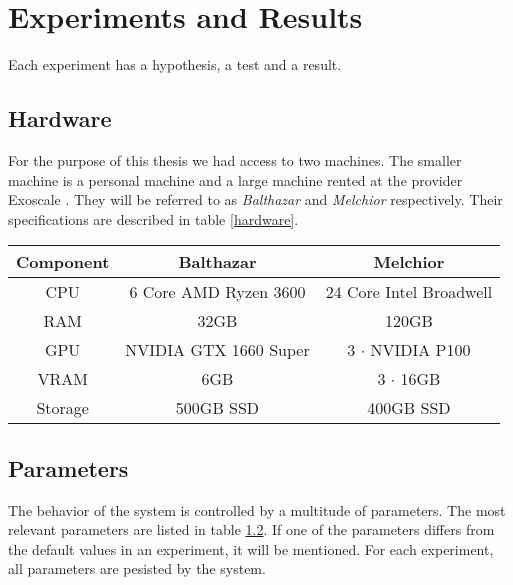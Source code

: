 \chapter{Experiments and Results}
\label{experiments-and-results}

Each experiment has a hypothesis, a test and a result.

\section{Hardware}
For the purpose of this thesis we had access to two machines. The smaller machine is a personal machine and a large machine rented at the provider Exoscale \cite{noauthor_exoscale_nodate}. They will be referred to as \textit{Balthazar} and \textit{Melchior} respectively. Their specifications are described in table \ref{hardware}.

\begin{table*}
    \begin{center}
        \begin{tabular}{ c|c|c }
            Component & Balthazar             & Melchior                \\
            \hline
            \hline
            CPU       & 6 Core AMD Ryzen 3600 & 24 Core Intel Broadwell \\
            RAM       & 32GB                  & 120GB                   \\
            GPU       & NVIDIA GTX 1660 Super & 3 $\cdot$ NVIDIA P100   \\
            VRAM      & 6GB                   & 3 $\cdot$ 16GB          \\
            Storage   & 500GB SSD             & 400GB SSD               \\
        \end{tabular}
    \end{center}
    \caption{Hardware specifications of the utilized machines}
    \label{hardware}
\end{table*}

\section{Parameters}
\label{parameters}
The behavior of the system is controlled by a multitude of parameters. The most relevant parameters are listed in table \ref{parameters}. If one of the parameters differs from the default values in an experiment, it will be mentioned. For each experiment, all parameters are pesisted by the system.

